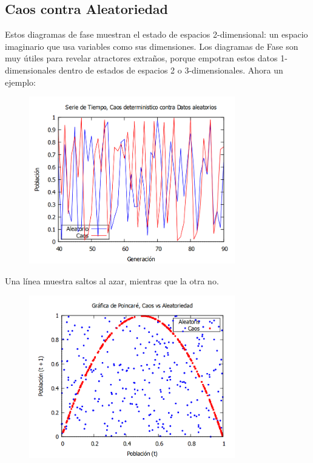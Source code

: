 \documentclass[a4paper]{article}
\begin{document}
\subsection{Caos contra Aleatoriedad}

Estos diagramas de fase muestran el estado de espacios 2-dimensional: un espacio imaginario que usa variables como sus dimensiones. Los diagramas de Fase son muy útiles para revelar atractores extraños, porque empotran estos datos 1-dimensionales dentro de estados de espacios 2 o 3-dimensionales. Ahora un ejemplo:

\begin{figure}[!ht]
 \centering
  \includegraphics[width=0.8\textwidth]{Caos-Aleatorio.png}
\end{figure}

Una línea muestra saltos al azar, mientras que la otra no.

\begin{figure}[!ht]
 \centering
  \includegraphics[width=0.8\textwidth]{Poincare-CaosAlea.png}
\end{figure}
\end{document}
